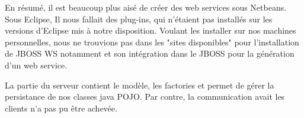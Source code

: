 \documentclass[a4paper,francais,titlepage]{report}
\begin{document}
En résumé, il est beaucoup plus aisé de créer des web services sous Netbeans. Sous Eclipse, Il nous fallait des plug-ins, qui n'étaient pas installés sur les versions d'Eclipse mis à notre disposition. Voulant les installer sur nos machines personnelles, nous ne trouvions pas dans les "sites disponibles" pour l'installation de JBOSS WS notamment et son intégration dans le JBOSS pour la génération d'un web service.

La partie du serveur contient le modèle, les factories et permet de gérer la persistance de nos classes java POJO. Par contre, la communication avait les clients n'a pas pu être achevée.
\end{document}
